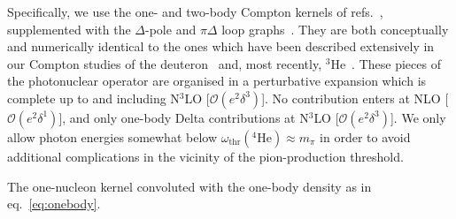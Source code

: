 \documentclass[12pt]{article}
\newcommand{\fourHe}{${}^{4} \mathrm{He}$\xspace}
\newcommand{\3}{\ss}
\newcommand{\mpi}{\ensuremath{m_\pi}}
\newcommand{\NXLO}[1]{N\ensuremath{{}^{#1}}LO\xspace}
\newcommand{\threeHe}{\ensuremath{{}^3}He\xspace}
\newcommand{\calO}{\mathcal{O}} \newcommand{\calP}{\mathcal{P}}
\numberwithin{equation}{section}
\begin{document}
Specifically, we use the one- and two-body Compton kernels of
refs.~\cite{Bernard:1991rq,Bernard:1995dp,Beane:1999uq},
supplemented with the
$\Delta$-pole and $\pi \Delta$ loop graphs~\cite{Hildebrandt:2003fm,
Hildebrandt:2004hh, Hildebrandt:2005ix, Hildebrandt:2005iw}. They are both
conceptually and numerically identical to the ones which have been described
extensively in our Compton studies of the deuteron~\cite{Hildebrandt:2005ix,
Hildebrandt:2005iw, Griesshammer:2013vga, Myers:2014ace, Myers:2015aba}
and, most recently, \threeHe~\cite{Margaryan:2018opu,
hgrie3He}. These pieces of the photonuclear operator are
organised in a perturbative expansion which is complete up to and including
\NXLO{3} [$\calO(e^2 \delta^3)$].
No contribution enters at NLO [$\calO(e^2\delta^1)$], and only
one-body Delta contributions at \NXLO{3} [$\calO(e^2\delta^3)$]. We
only allow photon energies somewhat below
$\omega_\mathrm{thr}(\mbox{\fourHe})\approx\mpi$ in order to
avoid additional complications in the vicinity of the pion-production threshold.

The one-nucleon kernel convoluted with the one-body density as in
eq.~\eqref{eq:onebody}.
\end{document}
